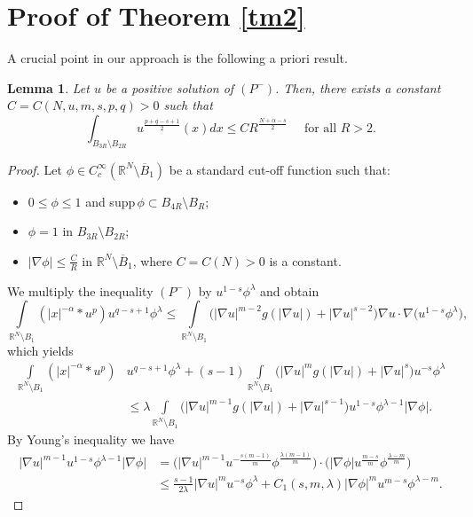 \documentclass[10pt,a4paper]{amsart}
\numberwithin{equation}{section}
\newcommand{\R}{\mathbb R}
\newcommand{\Ro}{\mathbb R^N\setminus \overline B_1}
\newtheorem{lemma}[theorem]{Lemma}
\begin{document}
\section{Proof of Theorem \ref{tm2}}

A crucial point in our approach is the following a priori result.
\begin{lemma}\label{lap}
Let $u$ be a positive solution of $(P^-)$. Then, there exists a constant $C=C(N,u,m,s,p,q)>0$ such that 
\begin{equation}\label{d20}
\int_{B_{3R}\setminus B_{2R}}u^{\frac{p+q-s+1}{2}}(x)dx \leq CR^{\frac{N+\alpha-s}{2}} \quad\mbox{ for all }R>2.
\end{equation}
\end{lemma}
\begin{proof}
Let $\phi\in C^\infty_c(\Ro)$ be a standard cut-off function such that:
\begin{itemize}
\item $0\leq \phi\leq 1$ and supp$\,\phi\subset B_{4R}\setminus B_{R}$;
\item  $\phi=1$ in $B_{3R}\setminus B_{2R}$;
\item  $|\nabla \phi|\leq \frac{C}{R}$ in $\Ro$, where $C=C(N)>0$ is a constant.
\end{itemize}
We multiply the inequality $(P^-)$ by $u^{1-s}\phi^\lambda$ and obtain
$$
\int\limits_{\R^N\setminus B_1}(|x|^{-\alpha}*u^p)u^{q-s+1}\phi^\lambda\leq \int\limits_{\R^N\setminus B_1}\Big(|\nabla u|^{m-2}g(|\nabla u|)+|\nabla u|^{s-2}\Big) \nabla u\cdot \nabla \big(u^{1-s}\phi^\lambda\big),
$$
which yields
\begin{equation}\label{d3}
\begin{aligned}
\int\limits_{\R^N\setminus B_1}(|x|^{-\alpha}*u^p)& u^{q-s+1}\phi^\lambda+(s-1) \int\limits_{\R^N\setminus B_1}\Big(|\nabla u|^{m}g(|\nabla u|)+|\nabla u|^{s}\Big) u^{-s}\phi^\lambda\\
&\leq \lambda \int\limits_{\R^N\setminus B_1}  \Big(|\nabla u|^{m-1}g(|\nabla u|)+|\nabla u|^{s-1}\Big) 
u^{1-s}\phi^{\lambda-1}|\nabla \phi|.
\end{aligned}
\end{equation}
By Young's inequality we have 
$$
\begin{aligned}
|\nabla u|^{m-1}u^{1-s}\phi^{\lambda-1}|\nabla \phi|&= \Big( |\nabla u|^{m-1} u^{-\frac{s(m-1)}{m}}\phi^{\frac{\lambda(m-1)}{m}}\Big)\cdot \Big(|\nabla \phi|u^{\frac{m-s}{m}}\phi^{\frac{\lambda-m}{m}}\Big)\\
&\leq \frac{s-1}{2\lambda}|\nabla u|^{m} u^{-s}\phi^\lambda+C_1(s,m,\lambda)|\nabla \phi|^{m} u^{m-s}\phi^{\lambda-m}.

\end{aligned}$$
\end{proof}
\end{document}
